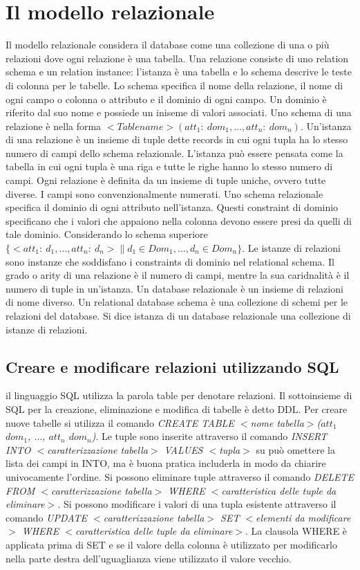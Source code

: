 \chapter{Il modello relazionale}
Il modello relazionale considera il database come una collezione di una o pi\`u relazioni dove ogni relazione \`e una tabella. Una relazione consiste di uno relation schema e un relation instance: l'istanza \`e una 
tabella e lo schema descrive le teste di colonna per le tabelle. Lo schema specifica il nome della relazione, il nome di ogni campo o colonna o attributo e il dominio di ogni campo. Un dominio \`e riferito dal suo 
nome e possiede un iniseme di valori associati. Uno schema di una relazione \`e nella forma $<Table name>(att_1:\ dom_1, \dots, att_n:\ dom_n)$. Un'istanza di una relazione \`e un insieme di tuple dette records 
in cui ogni tupla ha lo stesso numero di campi dello schema relazionale.  L'istanza pu\`o essere pensata come la tabella in cui ogni tupla \`e una riga e tutte le righe hanno lo stesso numero di campi. Ogni 
relazione \`e definita da un insieme di tuple uniche, ovvero tutte diverse. I campi sono convenzionalmente numerati. Uno schema relazionale specifica il dominio di ogni attributo nell'istanza. Questi constraint di 
dominio specificano che i valori che appaiono nella colonna devono essere presi da quelli di tale dominio. Considerando lo schema superiore $\{<att_1:\ d_1, \dots, att_n:\ d_n>\|d_1\in Dom_1, \dots, d_n\in 
Dom_n\}$. Le istanze di relazioni sono instanze che soddisfano i constraints di dominio nel relational schema. Il grado o arity di una relazione \`e il numero di campi, mentre la sua caridnalit\`a \`e il numero di 
tuple in un'istanza. Un database relazionale \`e un insieme di relazioni di nome diverso. Un relational database schema \`e una collezione di schemi per le relazioni del database. Si dice istanza di un database 
relazionale una collezione di istanze di relazioni.
\section{Creare e modificare relazioni utilizzando SQL}
il linguaggio SQL utilizza la parola table per denotare relazioni. Il sottoinsieme di SQL per la creazione, eliminazione e modifica di tabelle \`e detto DDL. Per creare nuove tabelle si utilizza il comando 
\emph{CREATE TABLE $<$nome tabella$>$($att_1$  $dom_1$, $\dots$, $att_n$  $dom_n$)}. Le tuple sono inserite attraverso il comando \emph{INSERT INTO $<$caratterizzazione tabella$>$ VALUES 
$<$tupla$>$} su pu\`o omettere la lista dei campi in INTO, ma \`e buona pratica includerla in modo da chiarire univocamente l'ordine. Si possono eliminare tuple attraverso il comando \emph{DELETE FROM 
$<$caratterizzazione tabella$>$ WHERE $<$caratteristica delle tuple da eliminare$>$}. Si possono modificare i valori di una tupla esistente attraverso il comando \emph{UPDATE  $<$caratterizzazione 
tabella$>$ SET $<$elementi da modificare$>$ WHERE $<$caratteristica delle tuple da eliminare$>$}. La clausola WHERE \`e applicata prima di SET e se il valore della colonna \`e utilizzato per modificarlo 
nella parte destra dell'uguaglianza viene utilizzato il valore vecchio. 
